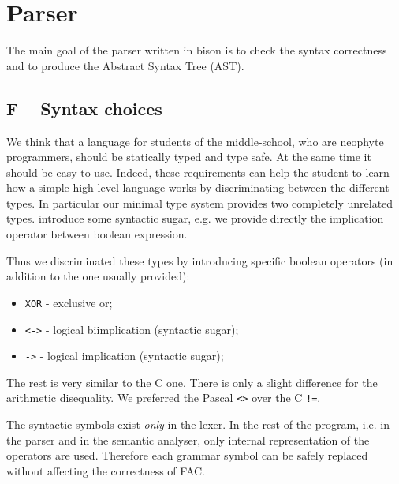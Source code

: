 \section{Parser}
\label{sec:parser}
The main goal of the parser written in bison is to check the
syntax correctness and to produce the Abstract Syntax Tree (AST).

\subsection{F -- Syntax choices}
We think that a language for students of the middle-school,
who are neophyte programmers, should be statically typed and type safe. 
At the same time it should be easy to use. 
Indeed, these requirements can help the student to learn how a simple 
high-level language works by discriminating between the different types.
In particular our minimal type system provides two completely unrelated types.
introduce some syntactic sugar, e.g. we 
provide directly the implication operator between boolean expression.

Thus we discriminated these types by introducing specific boolean
operators (in addition to the one usually provided):
\begin{itemize}
	\item \verb|XOR| - exclusive or;
	\item \verb|<->| - logical biimplication (syntactic sugar);
	\item \verb|->| - logical implication (syntactic sugar);
\end{itemize}

The rest is very similar to the C one. There is only a slight difference
for the arithmetic disequality. We preferred the Pascal \verb|<>| over 
the C \verb|!=|.

The syntactic symbols exist \emph{only} in the lexer. In the
rest of the program, i.e. in the parser and in the semantic analyser, only
internal representation of the operators are used. Therefore each grammar
symbol can be safely replaced without affecting the correctness of FAC.

